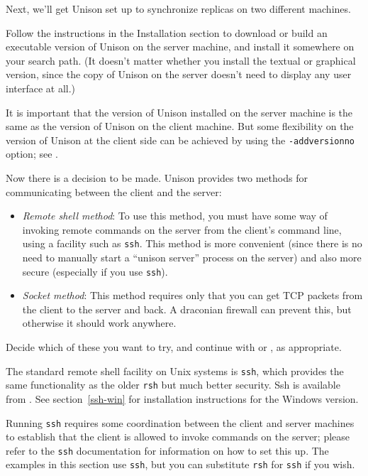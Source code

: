 \documentclass{article}
\begin{document}

Next, we'll get Unison set up to synchronize replicas on two different
machines.

Follow the instructions in the Installation section to download or
build an executable version of Unison on the server machine, and
install it somewhere on your search path.  (It doesn't matter whether
you install the textual or graphical version, since the copy of Unison on
the server doesn't need to display any user interface at all.)  

It is important that the version of Unison installed on the server
machine is the same as the version of Unison on the client machine.
But some flexibility on the version of Unison at the client side can
be achieved by using the \verb|-addversionno| option; see 
.

Now there is a decision to be made.  Unison provides two methods for
communicating between the client and the server:
\begin{itemize}
\item {\em Remote shell method}: To use this method, you must have
  some way of invoking remote commands on the server from the client's
  command line, using a facility such as \verb|ssh|.
  This method is more convenient (since there is no need to manually
  start a ``unison server'' process on the server) and also more
  secure (especially if you use \verb|ssh|).

\item {\em Socket method}: This method requires only that you can get
  TCP packets from the client to the server and back.  A draconian 
  firewall can prevent this, but otherwise it should work anywhere.
\end{itemize}

Decide which of these you want to try, and continue with
 or
, as appropriate.



The standard remote shell facility on Unix systems is \verb|ssh|, which provides the
same functionality as the older \verb|rsh| but much better security.  Ssh is available from
.  See section~\ref{ssh-win}
for installation instructions for the Windows version.

Running
\verb|ssh| requires some coordination between the client and server
machines to establish that the client is allowed to invoke commands on
the server; please refer to the \verb|ssh| documentation
for information on how to set this up.  The examples in this section
use \verb|ssh|, but you can substitute \verb|rsh| for \verb|ssh| if
you wish.
\end{document}
